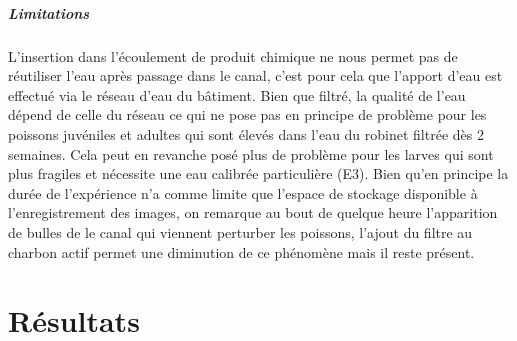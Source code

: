   \paragraph{Limitations}
  L'insertion dans l'écoulement de produit chimique ne nous permet pas de réutiliser l'eau après passage dans le canal, c'est pour cela que l'apport d'eau est effectué via le réseau d'eau du bâtiment. Bien que filtré, la qualité de l'eau dépend de celle du réseau ce qui ne pose pas en principe de problème pour les poissons juvéniles et adultes qui sont élevés dans l'eau du robinet filtrée dès 2 semaines. Cela peut en revanche posé plus de problème pour les larves qui sont plus fragiles et nécessite une eau calibrée particulière (E3).
  Bien qu'en principe la durée de l'expérience n'a comme limite que l'espace de stockage disponible à l'enregistrement des images, on remarque au bout de quelque heure l'apparition de bulles de le canal qui viennent perturber les poissons, l'ajout du filtre au charbon actif permet une diminution de ce phénomène mais il reste présent.


\chapter{Résultats}
\fi
